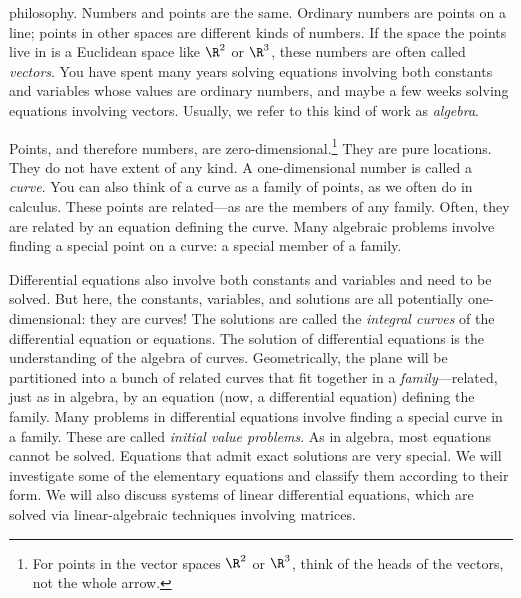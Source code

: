 \documentclass[symmetric]{tufte-handout}
\begin{document}
 philosophy. Numbers and points are the same.
Ordinary numbers are points on a line; points in other spaces are different
kinds of numbers. If the space the points live in is a Euclidean space like
$\R^2$ or $\R^3$, these numbers are often called \emph{vectors}. You have
spent many years solving equations involving both constants and variables
whose values are ordinary numbers, and maybe a few weeks solving equations
involving vectors. Usually, we refer to this kind of work as \emph{algebra}.

Points, and therefore numbers, are zero-dimensional.\footnote{For points in 
the vector spaces $\R^2$ or $\R^3$, think of the heads
of the vectors, not the whole arrow.} They are pure locations. They do not
have extent of any kind. A one-dimensional number is called a \emph{curve}.%
You can also think of a curve as a family of points, as we often do in
calculus. These points are related—as are the members of any family. Often,
they are related by an equation defining the curve. Many algebraic problems
involve finding a special point on a curve: a special member of a family.

Differential equations also involve both constants and variables and need to
be solved. But here, the constants, variables, and solutions are all 
potentially one-dimensional: they are curves! The solutions are called the 
\emph{integral curves} of
the differential equation or equations. The solution of differential equations
is the understanding of the algebra of curves.%
Geometrically, the plane will be
partitioned into a bunch of related curves that fit together in a
\emph{family}—related, just as in algebra, by an equation (now, a differential
equation) defining the family. Many problems in differential equations involve
finding a special curve in a family.%
These are called \emph{initial value
problems}. As in algebra, most equations cannot be solved. Equations that
admit exact solutions are very special. We will investigate some of the
elementary equations and classify them according to their form. We will also
discuss systems of linear differential equations, which are solved via 
linear-algebraic techniques involving matrices.
\end{document}
